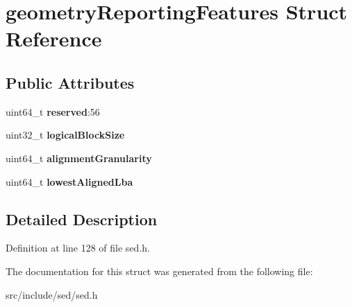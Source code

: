 \hypertarget{structgeometryReportingFeatures}{}\section{geometry\+Reporting\+Features Struct Reference}
\label{structgeometryReportingFeatures}
\subsection*{Public Attributes}
\begin{DoxyCompactItemize}
\item 
\hypertarget{structgeometryReportingFeatures_a4cc343deabed24ca411fc809cc9fcebe}{}uint64\+\_\+t {\bfseries reserved}\+:56\label{structgeometryReportingFeatures_a4cc343deabed24ca411fc809cc9fcebe}

\item 
\hypertarget{structgeometryReportingFeatures_acfd213317024f2940f096b536f3c32ba}{}uint32\+\_\+t {\bfseries logical\+Block\+Size}\label{structgeometryReportingFeatures_acfd213317024f2940f096b536f3c32ba}

\item 
\hypertarget{structgeometryReportingFeatures_aa2ca514afd70b14a994fef8b4f862fc6}{}uint64\+\_\+t {\bfseries alignment\+Granularity}\label{structgeometryReportingFeatures_aa2ca514afd70b14a994fef8b4f862fc6}

\item 
\hypertarget{structgeometryReportingFeatures_a5ce329ee875c0837b5e3d20b154cea4c}{}uint64\+\_\+t {\bfseries lowest\+Aligned\+Lba}\label{structgeometryReportingFeatures_a5ce329ee875c0837b5e3d20b154cea4c}

\end{DoxyCompactItemize}


\subsection{Detailed Description}


Definition at line 128 of file sed.\+h.



The documentation for this struct was generated from the following file\+:\begin{DoxyCompactItemize}
\item 
src/include/sed/sed.\+h\end{DoxyCompactItemize}
